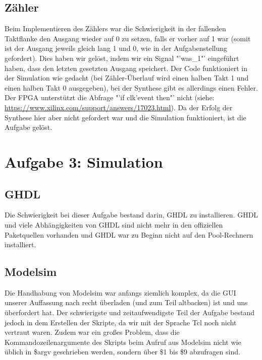 \documentclass[parskip=full]{scrartcl}
\begin{document}
		\subsection{Zähler}
			Beim Implementieren des Zählers war die Schwierigkeit in der fallenden Taktflanke den Ausgang wieder auf 0 zu setzen, falls er vorher auf 1 war (somit ist der Ausgang jeweils gleich lang 1 und 0, wie in der Aufgabenstellung gefordert). Dies haben wir gelöst, indem wir ein Signal "'was\_1"' eingeführt haben, dass den letzten gesetzten Ausgang speichert. Der Code funktioniert in der Simulation wie gedacht (bei Zähler-Überlauf wird einen halben Takt 1 und einen halben Takt 0 ausgegeben), bei der Synthese gibt es allerdings einen Fehler. Der FPGA unterstützt die Abfrage "'if clk'event then"' nicht (siehe: \url{https://www.xilinx.com/support/answers/17023.html}). Da der Erfolg der Synthese hier aber nicht gefordert war und die Simulation funktioniert, ist die Aufgabe gelöst.
			
	\section*{Aufgabe 3: Simulation}
		\setcounter{section}{3}
		\setcounter{subsection}{0}
		\subsection{GHDL}
			Die Schwierigkeit bei dieser Aufgabe bestand darin, GHDL zu installieren. GHDL und viele Abhängigkeiten von GHDL sind nicht mehr in den offiziellen Paketquellen vorhanden und GHDL war zu Beginn nicht auf den Pool-Rechnern installiert.
		\subsection{Modelsim}
			Die Handhabung von Modelsim war anfangs ziemlich komplex, da die GUI unserer Auffassung nach recht überladen (und zum Teil altbacken) ist und uns überfordert hat. Der schwierigste und zeitaufwendigste Teil der Aufgabe bestand jedoch in dem Erstellen der Skripte, da wir mit der Sprache Tcl noch nicht vertraut waren. Zudem war ein großes Problem, dass die Kommandozeilenargumente des Skripts beim Aufruf aus Modelsim nicht wie üblich in \$argv geschrieben werden, sondern über \$1 bis \$9 abzufragen sind.
\end{document}
